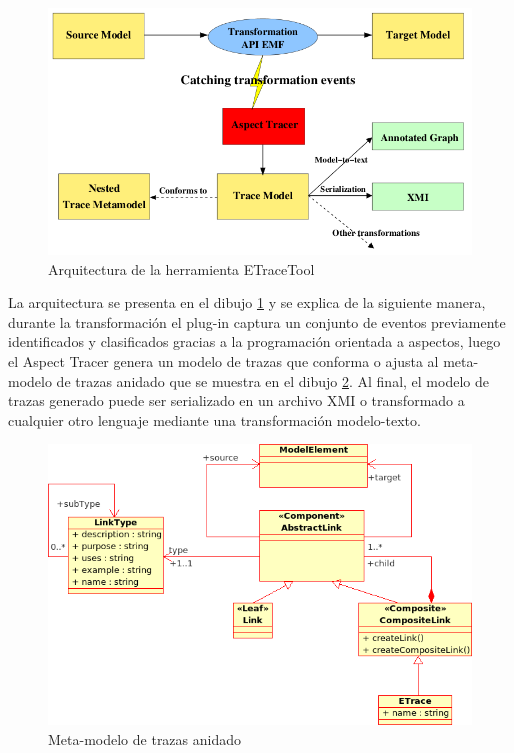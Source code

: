 \documentclass[a4paper,12pt,oneside]{book}
\begin{document}
\begin{figure}[hbtp]
\centering
\includegraphics[scale=0.5]{./img/ETraceTool_Arquitectura}
\caption{Arquitectura de la herramienta ETraceTool}
\label{fig:ArqETraceTool}
\end{figure}

La arquitectura se presenta en el dibujo \ref{fig:ArqETraceTool} y se explica de la siguiente manera, durante la transformación el plug-in captura un conjunto de eventos previamente identificados y clasificados gracias a la programación orientada a aspectos, luego el Aspect Tracer genera un modelo de trazas que conforma o ajusta al meta-modelo de trazas anidado que se muestra en el dibujo \ref{fig:ETraceToolMeta-modelo}. Al final, el modelo de trazas generado puede ser serializado en un archivo XMI o transformado a cualquier otro lenguaje mediante una transformación modelo-texto.

\begin{figure}[hbtp]
\centering
\includegraphics[scale=0.6]{./img/NestedTraceMetamodel}
\caption{Meta-modelo de trazas anidado}
\label{fig:ETraceToolMeta-modelo}
\end{figure}
\end{document}

